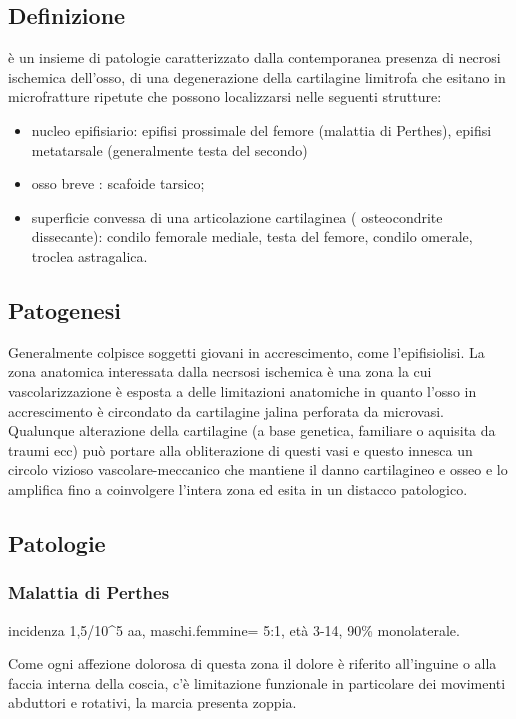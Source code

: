 \subsection{Definizione}
è un insieme di patologie caratterizzato dalla contemporanea presenza di necrosi ischemica dell'osso, di una degenerazione della cartilagine limitrofa che esitano in microfratture ripetute che possono localizzarsi nelle seguenti strutture:

\begin{itemize}
\item
  nucleo epifisiario: epifisi prossimale del femore (malattia di Perthes), epifisi metatarsale (generalmente testa del secondo)
\item
  osso breve : scafoide tarsico;
\item
  superficie convessa di una articolazione cartilaginea ( osteocondrite dissecante): condilo femorale mediale, testa del femore, condilo omerale, troclea astragalica.
\end{itemize}

\subsection{Patogenesi}

Generalmente colpisce soggetti giovani in accrescimento, come l'epifisiolisi. La zona anatomica interessata dalla necrsosi ischemica è una zona la cui vascolarizzazione è esposta a delle limitazioni anatomiche in quanto l'osso in accrescimento è circondato da cartilagine jalina perforata da microvasi. Qualunque alterazione della cartilagine (a base genetica, familiare o aquisita da traumi ecc) può portare alla obliterazione di questi vasi e questo innesca un circolo vizioso vascolare-meccanico che mantiene il danno cartilagineo e osseo e lo amplifica fino a coinvolgere l'intera zona ed esita in un distacco
patologico.

\subsection{Patologie}

\subsubsection{Malattia di Perthes} 
incidenza 1,5/10\^{}5 aa, maschi.femmine=
5:1, età 3-14, 90\% monolaterale.

Come ogni affezione dolorosa di questa zona il dolore è riferito all'inguine o alla faccia interna della coscia, c'è limitazione funzionale in particolare dei movimenti abduttori e rotativi, la marcia presenta zoppia.

